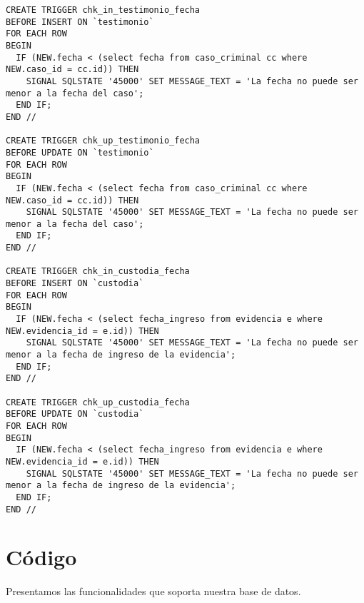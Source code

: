 \documentclass[10pt,a4paper]{article}
\begin{document}
\begin{verbatim}
CREATE TRIGGER chk_in_testimonio_fecha
BEFORE INSERT ON `testimonio`
FOR EACH ROW
BEGIN
  IF (NEW.fecha < (select fecha from caso_criminal cc where NEW.caso_id = cc.id)) THEN
    SIGNAL SQLSTATE '45000' SET MESSAGE_TEXT = 'La fecha no puede ser menor a la fecha del caso';
  END IF;
END //

CREATE TRIGGER chk_up_testimonio_fecha
BEFORE UPDATE ON `testimonio`
FOR EACH ROW
BEGIN
  IF (NEW.fecha < (select fecha from caso_criminal cc where NEW.caso_id = cc.id)) THEN
    SIGNAL SQLSTATE '45000' SET MESSAGE_TEXT = 'La fecha no puede ser menor a la fecha del caso';
  END IF;
END //

CREATE TRIGGER chk_in_custodia_fecha
BEFORE INSERT ON `custodia`
FOR EACH ROW
BEGIN
  IF (NEW.fecha < (select fecha_ingreso from evidencia e where NEW.evidencia_id = e.id)) THEN
    SIGNAL SQLSTATE '45000' SET MESSAGE_TEXT = 'La fecha no puede ser menor a la fecha de ingreso de la evidencia';
  END IF;
END //

CREATE TRIGGER chk_up_custodia_fecha
BEFORE UPDATE ON `custodia`
FOR EACH ROW
BEGIN
  IF (NEW.fecha < (select fecha_ingreso from evidencia e where NEW.evidencia_id = e.id)) THEN
    SIGNAL SQLSTATE '45000' SET MESSAGE_TEXT = 'La fecha no puede ser menor a la fecha de ingreso de la evidencia';
  END IF;
END //
\end{verbatim}

\section{Código}
Presentamos las funcionalidades que soporta nuestra base de datos.
\end{document}
